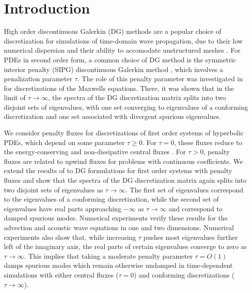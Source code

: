 \documentclass[preprint,10pt]{elsarticle}
\begin{document}
\section{Introduction}

High order discontinuous Galerkin (DG) methods are a popular choice of discretization for simulations of time-domain wave propagation, due to their low numerical dispersion and their ability to accomodate unstructured meshes \cite{riviere2008discontinuous,hesthaven2007nodal}.  For PDEs in second order form, a common choice of DG method is the symmetric interior penalty (SIPG) discontinuous Galerkin method \cite{riviere2008discontinuous}, which involves a penalization parameter $\tau$.  The role of this penalty parameter was investigated in \cite{Warburton20063205} for discretizations of the Maxwells equations.  There, it was shown that in the limit of $\tau\rightarrow\infty$, the spectra of the DG discretization matrix splits into two disjoint sets of eigenvalues, with one set converging to eigenvalues of a conforming discretization and one set associated with divergent spurious eigenvalues.  

We consider penalty fluxes for discretizations of first order systems of hyperbolic PDEs, which depend on some parameter $\tau \geq 0$.  For $\tau = 0$, these fluxes reduce to the energy-conserving and non-dissipative central fluxes \cite{fezoui2005convergence}.  For $\tau > 0$, penalty fluxes are related to upwind fluxes for problems with continuous coefficients.  We extend the results of \cite{Warburton20063205} to DG formulations for first order systems with penalty fluxes and show that the spectra of the DG discretization matrix again splits into two disjoint sets of eigenvalues as $\tau\rightarrow\infty$.  The first set of eigenvalues correspond to the eigenvalues of a conforming discretization, while the second set of eigenvalues have real parts approaching $-\infty$ as $\tau\rightarrow \infty$ and correspond to damped spurious modes.  Numerical experiments verify these results for the advection and acoustic wave equations in one and two dimensions.  Numerical experiments also show that, while increasing $\tau$ pushes most eigenvalues further left of the imaginary axis, the real parts of certain eigenvalues converge to zero as $\tau\rightarrow\infty$.  This implies that taking a moderate penalty parameter $\tau = O(1)$ damps spurious modes which remain otherwise undamped in time-dependent simulations with either central fluxes ($\tau = 0$) and conforming discretizations ($\tau \rightarrow \infty$).  
\end{document}
